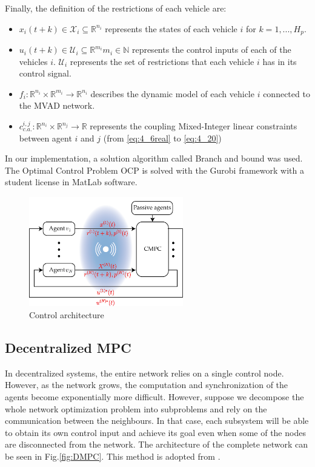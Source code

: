 Finally, the definition of the restrictions of each vehicle are:
\begin{itemize}
    \item $x_i(t+k) \in  \mathcal{X}_i \subseteq \mathbb{R}^{n_i}$ represents the states of each vehicle $i$ for $k=1,...,H_p$.
    \item $u_i(t+k) \in  \mathcal{U}_i \subseteq \mathbb{R}^{m_i} m_i \in \mathbb{N}$ represents the control inputs of each of the vehicles $i$. $\mathcal{U}_i$ represents the set of restrictions that each vehicle $i$ has in its control signal.
    \item $f_i : \mathbb{R}^{n_i} \times \mathbb{R}^{m_i} \to \mathbb{R}^{n_i}$ describes the dynamic model of each vehicle $i$ connected to the MVAD network.
    \item $c^{i,j}_{c.a.}: \mathbb{R}^{n_i} \times \mathbb{R}^{n_j} \to \mathbb{R}$ represents the coupling Mixed-Integer linear constraints between agent $i$ and $j$ (from \ref{eq:4_6real} to \ref{eq:4_20})
\end{itemize}


In our implementation, a solution algorithm called Branch and bound was used. The Optimal Control Problem OCP is solved with the Gurobi framework \cite{Gurobi} with a student license in MatLab software.

\begin{figure}[H]
    \centering
    \includegraphics[width=0.6\textwidth]{Kap4/CMPC.png}
    \caption{Control architecture}
    \label{fig:CMPC}
\end{figure}


\subsection{Decentralized MPC}
\label{subsec:descentr}
In decentralized systems, the entire network relies on a single control node. However, as the network grows, the computation and synchronization of the agents become exponentially more difficult. However, suppose we decompose the whole network optimization problem into subproblems and rely on the communication between the neighbours. In that case, each subsystem will be able to obtain its own control input and achieve its goal even when some of the nodes are disconnected from the network. The architecture of the complete network can be seen in Fig.\ref{fig:DMPC}. This method is adopted from \cite{13t_distributed,32t_DMPC}.

